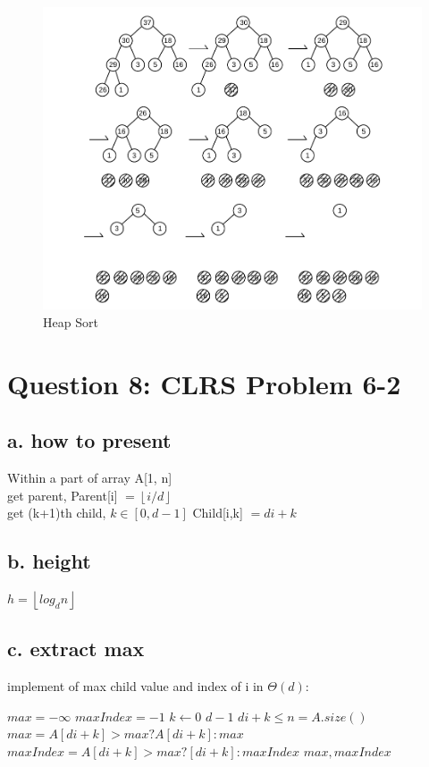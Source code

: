 \documentclass[]{article}
\begin{document}
\begin{figure}
	\centering
	\includegraphics[width=0.9\linewidth]{2_heap_sort}
	\caption{Heap Sort}
	\label{fig:2hs}
\end{figure}

\section{Question 8: CLRS Problem 6-2}
\subsection{a. how to present}
Within a part of array A[1, n]\\
get parent, Parent[i] $ = \left \lfloor i/d \right \rfloor$\\
get (k+1)th child, $k \in [0, d-1]$ Child[i,k] $= di + k$\\

\subsection{b. height}
$h = \left \lfloor log_{d}n \right \rfloor $

\subsection{c. extract max}

implement of max child value and index of i in $\Theta(d)$:\\
\begin{codebox}

	\li $max = -\infty$
	\li $maxIndex = -1$
	\li \For $k \gets 0$ \To $d-1$
	\li 	\Do  \If $di+k \le n=A.size()$
	\li 	\Then $max = A[di + k]>max?A[di+k]:max$
	\li			 $maxIndex =  A[di + k]>max?[di+k]:maxIndex$
	\End
	\End
	\li \Return $max, maxIndex$

\end{codebox}
\end{document}
